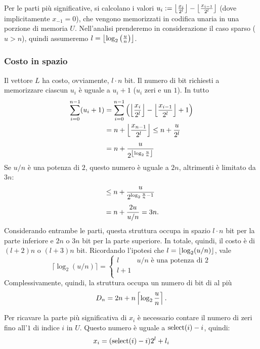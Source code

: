 Per le parti più significative, si calcolano i valori $u_i:=\left\lfloor \frac{x_i}{2^l} \right\rfloor-\left\lfloor \frac{x_{i-1}}{2^l} \right\rfloor$ (dove implicitamente $x_{-1}=0$), che vengono memorizzati in codifica unaria in una porzione di memoria $U$.
Nell'analisi prenderemo in considerazione il caso sparso ($u>n$), quindi assumeremo $l=\left\lfloor \log_2\left(\frac{u}{n}\right) \right\rfloor$.


\subsubsection{Costo in spazio}
Il vettore $L$ ha costo, ovviamente, $l\cdot n$ bit.
Il numero di bit richiesti a memorizzare ciascun $u_i$ è uguale a $u_i+1$ ($u_i$ zeri e un $1$). In tutto
\begin{align*}
	\sum_{i=0}^{n-1}(u_i+1) & = \sum_{i=0}^{n-1}\left(\left\lfloor \frac{x_i}{2^l} \right\rfloor-\left\lfloor \frac{x_{i-1}}{2^l} \right\rfloor+1\right) \\
	                        & = n + \left\lfloor \frac{x_{n-1}}{2^l} \right\rfloor \leq n + \frac{u}{2^l}                             \\[1ex]
	                        & = n + \frac{u}{2^{\left\lfloor \log_2\frac{u}{n} \right\rfloor}}
\end{align*}
Se $u/n$ è una potenza di $2$, questo numero è uguale a $2n$, altrimenti è limitato da $3n$:
\begin{align*}
	 & \leq n+\frac{u}{2^{\log_2\frac{u}{n}-1}} \\[1ex]
	 & = n+\frac{2u}{u/n} = 3n \text.
\end{align*}
Considerando entrambe le parti, questa struttura occupa in spazio $l\cdot n$ bit per la parte inferiore e $2n$ o $3n$ bit per la parte superiore.
In totale, quindi, il costo è di $(l+2)n$ o $(l+3)n$ bit.
Ricordando l'ipotesi che $l=\left\lfloor \log_2(u/n) \right\rfloor$, vale
\begin{equation*}
	\lceil \log_2(u/n) \rceil =
	\begin{cases}
		l & u/n \text{ è una potenza di } 2 \\
		l +1                                \\
	\end{cases}
\end{equation*}
Complessivamente, quindi, la struttura occupa un numero di bit di al più
\begin{equation*}
	D_n = 2n+n\left\lceil \log_2\frac un \right\rceil \text.
\end{equation*}


Per ricavare la parte più significativa di $x_i$ è necessario contare il numero di zeri fino all'$1$ di indice $i$ in $U$. Questo numero è uguale a $\mathrm{select}(i)-i$, quindi:
\begin{equation*}
	x_i=(\mathrm{select}(i)-i)2^l+l_i
\end{equation*}

